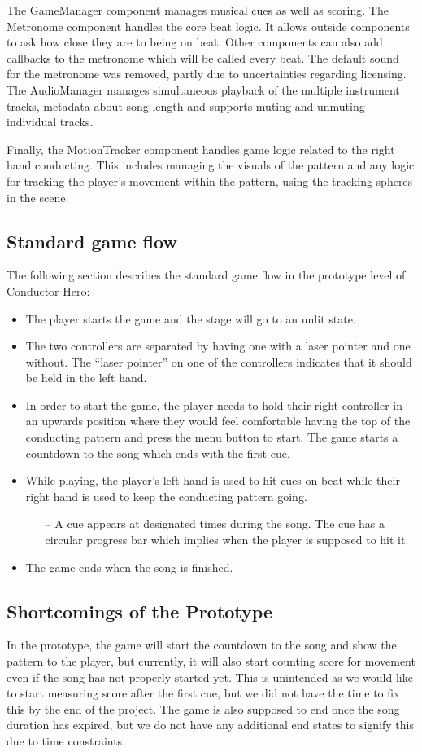 The GameManager component manages musical cues as well as scoring. The Metronome component handles the core beat logic. It allows outside components to ask how close they are to being on beat. Other components can also add callbacks to the metronome which will be called every beat. The default sound for the metronome was removed, partly due to uncertainties regarding licensing. The AudioManager manages simultaneous playback of the multiple instrument tracks, metadata about song length and supports muting and unmuting individual tracks. 

Finally, the MotionTracker component handles game logic related to the right hand conducting. This includes managing the visuals of the pattern and any logic for tracking the player’s movement within the pattern, using the tracking spheres in the scene.  

\subsection{Standard game flow} 
The following section describes the standard game flow in the prototype level of Conductor Hero:
\begin{itemize}
\item The player starts the game and the stage will go to an unlit state.  
\item The two controllers are separated by having one with a laser pointer and one without. The “laser pointer” on one of the controllers indicates that it should be held in the left hand.
\item In order to start the game, the player needs to hold their right controller in an upwards position where they would feel comfortable having the top of the conducting pattern and press the menu button to start. 
The game starts a countdown to the song which ends with the first cue.
\item While playing, the player’s left hand is used to hit cues on beat while their right hand is used to keep the conducting pattern going. 
    \begin{itemize}
    \item[--] A cue appears at designated times during the song. The cue has a circular progress bar which implies when the player is supposed to hit it.
    \end{itemize}
\item The game ends when the song is finished.
\end{itemize}

\subsection{Shortcomings of the Prototype}
In the prototype, the game will start the countdown to the song and show the pattern to the player, but currently, it will also start counting score for movement even if the song has not properly started yet. This is unintended as we would like to start measuring score after the first cue, but we did not have the time to fix this by the end of the project. The game is also supposed to end once the song duration has expired, but we do not have any additional end states to signify this due to time constraints.  

